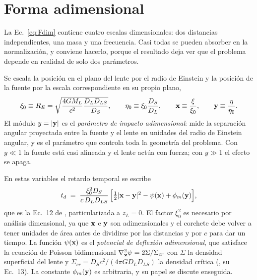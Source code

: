 \documentclass[11pt,a4paper,openany]{book}
\begin{document}
\section{Forma adimensional}
\label{sec:adimensional}

La Ec.~\eqref{eq:Fdim} contiene cuatro escalas dimensionales: dos distancias
independientes, una masa y una frecuencia. Casi todas se pueden absorber en la
normalizaci\'on, y conviene hacerlo, porque el resultado deja ver que el
problema depende en realidad de solo dos par\'ametros.

Se escala la posici\'on en el plano del lente por el radio de Einstein y la
posici\'on de la fuente por la escala correspondiente en su propio plano,
\begin{equation}
  \xi_0\equiv R_E=\sqrt{\frac{4GM_L}{c^{2}}\frac{D_LD_{LS}}{D_S}},
  \qquad
  \eta_0\equiv\xi_0\frac{D_S}{D_L},
  \qquad
  \vb x\equiv\frac{\vb\xi}{\xi_0},
  \qquad
  \vb y\equiv\frac{\vb\eta}{\eta_0} .
  \label{eq:scalings}
\end{equation}
El m\'odulo $y=|\vb y|$ es el \emph{par\'ametro de impacto adimensional}: mide
la separaci\'on angular proyectada entre la fuente y el lente en unidades del
radio de Einstein angular, y es el par\'ametro que controla toda la geometr\'ia
del problema. Con $y\ll1$ la fuente est\'a casi alineada y el lente act\'ua con
fuerza; con $y\gg1$ el efecto se apaga.

En estas variables el retardo temporal se escribe
\begin{equation}
  t_d\;=\;\frac{\xi_0^{2}D_S}{c\,D_LD_{LS}}\,
  \Big[\tfrac12|\vb x-\vb y|^{2}-\psi(\vb x)+\phi_m(\vb y)\Big] ,
  \label{eq:td_dimensionless}
\end{equation}
que es la Ec.~12 de \citet{Takahashi2003}, particularizada a $z_L=0$. El
factor $\xi_0^{2}$ es necesario por an\'alisis dimensional, ya que $\vb x$ e
$\vb y$ son adimensionales y el corchete debe volver a tener unidades de
\'area antes de dividirse por las distancias y por $c$ para dar un tiempo. La funci\'on $\psi(\vb x)$ es el
\emph{potencial de deflexi\'on adimensional}, que satisface la ecuaci\'on de
Poisson bidimensional $\nabla^{2}_{\vb x}\psi=2\Sigma/\Sigma_{cr}$ con
$\Sigma$ la densidad superficial del lente y
$\Sigma_{cr}=D_S c^2/(4\pi G D_LD_{LS})$ la densidad cr\'itica
(\citealp{Takahashi2003}, su Ec.~13). La constante $\phi_m(\vb y)$ es
arbitraria, y su papel se discute enseguida.
\end{document}
